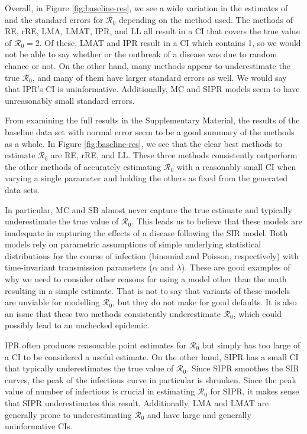 \documentclass[12pt]{article}
\newcommand{\rr}{\ensuremath{\mathcal{R}_0}}
\begin{document}
Overall, in Figure \ref{fig:baseline-res}, we see a wide variation in the estimates of and the standard errors for $\rr$ depending on the method used.  The methods of RE, rRE, LMA, LMAT, IPR, and LL all result in a CI that covers the true value of $\rr=2$.  Of these, LMAT and IPR result in a CI which contains 1, so we would not be able to say whether or the outbreak of a disease was due to random chance or not. On the other hand, many methods appear to underestimate the true $\rr$, and many of them have larger standard errors as well.  We would say that IPR's CI is uninformative. Additionally, MC and SIPR models seem to have unreasonably small standard errors.

From examining the full results in the Supplementary Material, the results of the baseline data set with normal error seem to be a good summary of the methods as a whole.  In Figure \ref{fig:baseline-res}, we see that the clear best methods to estimate $\rr$ are RE, rRE, and LL.  These three methods consistently outperform the other methods of accurately estimating $\rr$ with a reasonably small CI when varying a single parameter and holding the others as fixed from the generated data sets.

In particular, MC and SB almost never capture the true estimate and typically underestimate the true value of $\rr$.  This leads us to believe that these models are inadequate in capturing the effects of a disease following the SIR model.  Both models rely on parametric assumptions of simple underlying statistical distributions for the course of infection (binomial and Poisson, respectively) with time-invariant transmission parameters ($\alpha$ and $\lambda$).  These are good examples of why we need to consider other reasons for using a model other than the math resulting in a simple estimate.  That is not to say that variants of these models are unviable for modelling $\rr$, but they do not make for good defaults.  It is also an issue that these two methods consistently underestimate $\rr$, which could possibly lead to an unchecked epidemic.

IPR often produces reasonable point estimates for $\rr$ but simply has too large of a CI to be considered a useful estimate.  On the other hand, SIPR has a small CI that typically underestimates the true value of $\rr$.  Since SIPR smoothes the SIR curves, the peak of the infectious curve in particular is shrunken.  Since the peak value of number of infectious is crucial in estimating $\rr$ for SIPR, it makes sense that SIPR underestimates this result.  Additionally, LMA and LMAT are generally prone to underestimating $\rr$ and have large and generally uninformative CIs.
\end{document}
